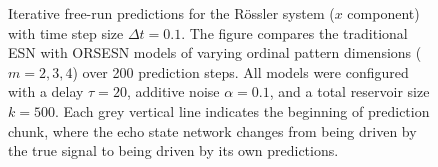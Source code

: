 \begin{figure}
    \centering
    \caption{Iterative free-run predictions for the Rössler system ($x$ component) with time step size $\Delta t=0.1$. The figure compares the traditional ESN with ORSESN models of varying ordinal pattern dimensions ($m=2,3,4$) over 200 prediction steps. All models were configured with a delay $\tau=20$, additive noise $\alpha=0.1$, and a total reservoir size $k=500$. Each grey vertical line indicates the beginning of prediction chunk, where the echo state network changes from being driven by the true signal to being driven by its own predictions.}
    \label{fig:ORSESN_rossler_freerun}
\end{figure}



